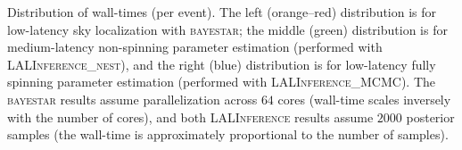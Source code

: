 \label{fig:wall-time} Distribution of wall-times (per event). The left (orange--red) distribution is for low-latency sky localization with \textsc{bayestar}; the middle (green) distribution is for medium-latency non-spinning parameter estimation (performed with \textsc{LALInference\_nest}), and the right (blue) distribution is for low-latency fully spinning parameter estimation (performed with \textsc{LALInference\_MCMC}). The \textsc{bayestar} results assume parallelization across $64$ cores (wall-time scales inversely with the number of cores), and both \textsc{LALInference} results assume $2000$ posterior samples (the wall-time is approximately proportional to the number of samples).